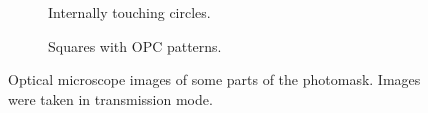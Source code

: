 \begin{figure}[htb]
\begin{subfigure}[t]{0.24\linewidth}
      	\caption{Internally touching circles.}
      	\label{fig:TS_05_20_13_54_28}
    \end{subfigure}
    \hfill
    \begin{subfigure}[t]{0.24\linewidth}
      	\caption{Squares with OPC patterns.}
      	\label{fig:TS_05_20_13_54_51}
    \end{subfigure}
    \caption{Optical microscope images of some parts of the photomask. Images were taken in transmission mode.}
\end{figure}

